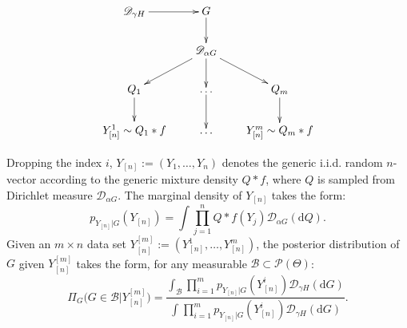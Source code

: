\documentclass[MSNbibl,number,citesort]{arxbj}
\def\pi{\uppi}
\def\comment{}
\newcommand{\Pcal}{\mathscr{P}}
\newcommand{\BB}{\mathscr{B}}
\newcommand{\DP}{\mathscr{D}}
\newcommand{\YYn}{Y_{[n]}}
\begin{document}
\[
\xymatrix@C=0.70cm @R=0.70cm{
\xymatrixcolsep{40pt}
\DP_{\gamma H} \ar[r] &G \ar[d] &\\
& \DP_{\alpha G} \ar[dl] \ar[d] \ar[dr]& \\
Q_1\ar[d] & \ldots\ar[d]& Q_m\ar[d] \\
\YYn^{1} \sim Q_1*f & \ldots&\YYn^{m} \sim Q_m*f }
\]
%
%


Dropping the index $i$,
$\YYn:=(Y_1,\ldots, Y_n)$ denotes
the generic i.i.d. random $n$-vector according to
the generic mixture density $Q*f$, where $Q$ is sampled from
Dirichlet measure $\DP_{\alpha G}$. The
marginal density of $\YYn$ takes the form:
%
%
\begin{equation}
\label{Eqn-pG} {p_{Y_{[n]}|G}}(\YYn) = \int\prod
_{j=1}^{n}Q*f(Y_{j})
\DP_{\alpha G}(\mathrm{d}Q).
\end{equation}
%
Given an $m\times n$ data set
$\YYn^{[m]} := (\YYn^1,\ldots,\YYn^m)$,
the posterior distribution of $G$ given $\YYn^{[m]}$ takes the form,
for any measurable $\BB\subset\Pcal(\Theta)$:
%
%
\begin{equation}
\label{Eqn-priorG} \Pi_G \bigl(G\in\BB|\YYn^{[m]} \bigr) =
\frac{\int_{\BB}\prod_{i=1}^{m}{p_{Y_{[n]}|G}}(\YYn^i)
\DP_{\gamma H} (\mathrm{d}G)}{
\int_{}\prod_{i=1}^{m}{p_{Y_{[n]}|G}}(\YYn^i) \DP
_{\gamma H}(\mathrm{d}G)}.
\end{equation}
\end{document}
